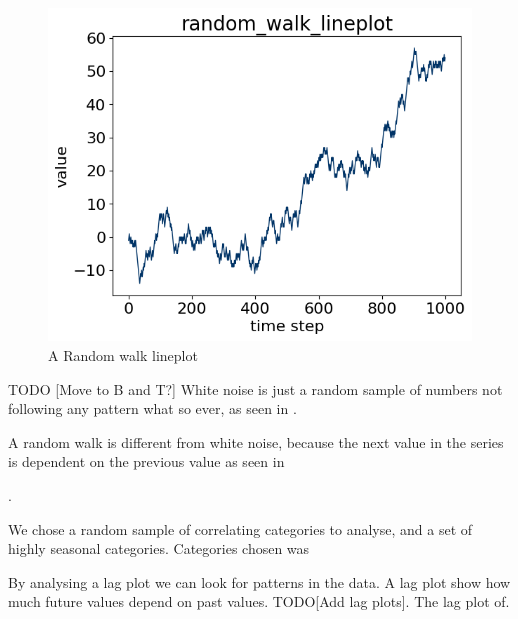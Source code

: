 \begin{figure}[h!]
  \centering
  \includegraphics[width=\textwidth]{./figs/code_generated/data_exploration/random_walk_lineplot.png}
  \hfill
  \caption{A Random walk lineplot}
  \label{fig:dataset:random_walk}
\end{figure}

TODO [Move to B and T?]
White noise is just a random sample of numbers not following any pattern what so ever, as seen in
.


A random walk is different from white noise, because the next value in the series is dependent on the previous value as seen in

.

We chose a random sample of correlating categories to analyse,
and a set of highly seasonal categories.
Categories chosen was
%



By analysing a lag plot we can look for patterns in the data. A lag plot
show how much future values depend on past values.
TODO[Add lag plots].
The lag plot of.



